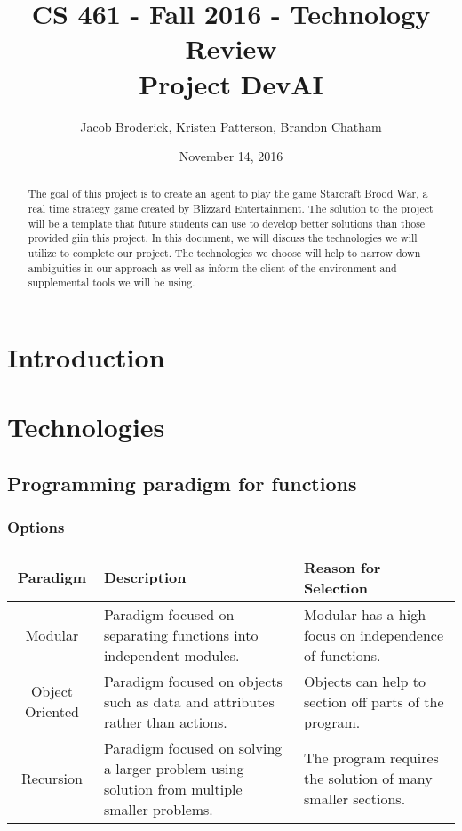 \documentclass[10pt,letterpaper,onecolumn,draftclsnofoot]{IEEEtran}
\begin{document}
\begin{titlepage}

  \title{CS 461 - Fall 2016 - Technology Review \\ Project DevAI}
  \author{Jacob Broderick, Kristen Patterson, Brandon Chatham}
  \date{November 14, 2016}
  \maketitle
  \vspace{4cm}
  \begin{abstract}
  	\noindent 
  	  	\noindent
	The goal of this project is to create an agent to play the game Starcraft Brood War, a real time strategy game created by Blizzard Entertainment. The solution to the project will be a template that future students can use to develop better solutions than those provided giin this project. In this document, we will discuss the technologies we will utilize to complete our project. The technologies we choose will help to narrow down ambiguities in our approach as well as inform the client of the environment and supplemental tools we will be using.
   \end{abstract}
\end{titlepage}

\tableofcontents

\newpage

\section{Introduction}

\section{Technologies}

\subsection{Programming paradigm for functions}
\subsubsection{Options}
\begin{center}
\begin{tabular}{ ||C|L|L|| } 
\hline
Paradigm & Description & Reason for Selection \\
 \hline
 Modular & Paradigm focused on separating functions into independent modules. & Modular has a high focus on independence of functions. \\ 
 \hline
 Object Oriented & Paradigm focused on objects such as data and attributes rather than actions. & Objects can help to section off parts of the program. \\ 
 \hline
 Recursion & Paradigm focused on solving a larger problem using solution from multiple smaller problems. & The program requires the solution of many smaller sections. \\ 
 \hline
\end{tabular}
\end{center}
\end{document}
